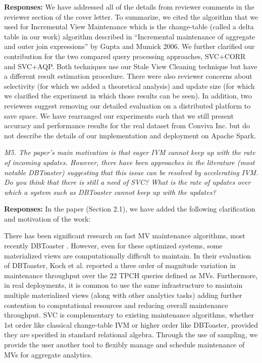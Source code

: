 {\bf Responses:} We have addressed all of the details from reviewer comments in the reviewer section of the cover letter. To summarize, we cited the algorithm that we used for Incremental View Maintenance which is the change-table (called a delta table in our work) algorithm described in “Incremental maintenance of aggregate and outer join expressions” by Gupta and Mumick 2006. We further clarified our contribution for the two compared query processing approaches, SVC+CORR and SVC+AQP. Both techniques use our Stale View Cleaning technique but have a different result estimation procedure. There were also reviewer concerns about selectivity (for which we added a theoretical analysis) and update size (for which we clarified the experiment in which those results can be seen).
In addition, two reviewers suggest removing our detailed evaluation on a distributed platform to save space. We have rearranged our experiments such that we still present accuracy and performance results for the real dataset from Conviva Inc. but do not describe the details of our implementation and deployment on Apache Spark.

\vspace{1em}
\emph{M5. The paper's main motivation is that eager IVM cannot keep up with the rate of incoming updates. However, there have been approaches in the literature (most notable DBToaster) suggesting that this issue can be resolved by accelerating IVM. Do you think that there is still a need of SVC? What is the rate of updates over which a system such as DBToaster cannot keep up with the updates?}

\vspace{.25em}

{\bf Responses:} In the paper (Section 2.1), we have added the following clarification and motivation of the work:
\begin{displayquote}There has been significant research on fast MV maintenance algorithms, most recently DBToaster \cite{DBLP:journals/vldb/KochAKNNLS14}. However, even for these optimized systems, some materialized views are computationally difficult to maintain. In their evaluation of DBToaster, Koch et al. \cite{DBLP:journals/vldb/KochAKNNLS14} reported a three order of magnitude variation in maintenance throughput over the 22 TPCH queries defined as MVs. Furthermore, in real deployments, it is common to use the same infrastructure to maintain multiple materialized views (along with other analytics tasks) adding further contention to computational resources and reducing overall maintenance throughput. SVC is complementary to existing maintenance algorithms, whether 1st order like classical change-table IVM or higher order like DBToaster, provided they are specified in standard relational algebra. Through the use of sampling, we provide the user another tool to flexibly manage and schedule maintenance of MVs for aggregate analytics.\end{displayquote}

